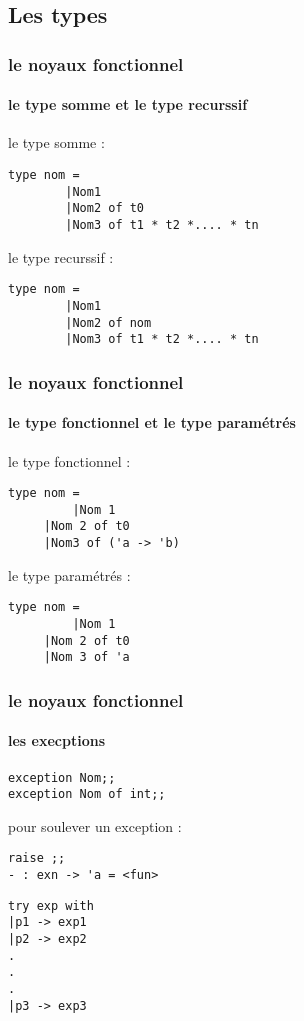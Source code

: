       \subsection{Les types}
\begin{frame}[fragile]
	\frametitle{le noyaux fonctionnel}
	\framesubtitle{le type somme et le type recurssif}
	le type somme :
	\begin{lstlisting}
type nom =
        |Nom1 
        |Nom2 of t0 
        |Nom3 of t1 * t2 *.... * tn 
	\end{lstlisting}
	le type recurssif :
	\begin{lstlisting}
type nom =
        |Nom1
        |Nom2 of nom
        |Nom3 of t1 * t2 *.... * tn
         \end{lstlisting}
\end{frame}

\begin{frame}[fragile]
  \frametitle{le noyaux fonctionnel}
  \framesubtitle{le type fonctionnel et le type paramétrés}
  le type fonctionnel : 
  \begin{lstlisting}
type nom =
         |Nom 1
	 |Nom 2 of t0
	 |Nom3 of ('a -> 'b)
  \end{lstlisting}
  le type paramétrés :
  \begin{lstlisting}
type nom = 
         |Nom 1 
	 |Nom 2 of t0
	 |Nom 3 of 'a 
  \end{lstlisting}
\end{frame}

\begin{frame}[fragile]
  \frametitle{le noyaux fonctionnel}
  \framesubtitle{les execptions}
  \begin{lstlisting}
exception Nom;;
exception Nom of int;;
  \end{lstlisting}
pour soulever un exception : 
\begin{lstlisting}
raise ;;
- : exn -> 'a = <fun>
\end{lstlisting}
\begin{lstlisting}
try exp with 
|p1 -> exp1
|p2 -> exp2
.
.
.
|p3 -> exp3
\end{lstlisting}

\end{frame}
